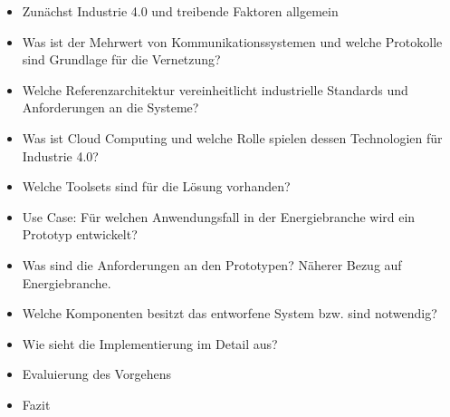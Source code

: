 \begin{itemize}
  \item Zunächst Industrie 4.0 und treibende Faktoren allgemein
  \item Was ist der Mehrwert von Kommunikationssystemen und welche Protokolle sind Grundlage für die Vernetzung?
  \item Welche Referenzarchitektur vereinheitlicht industrielle Standards und Anforderungen an die Systeme?
  \item Was ist Cloud Computing und welche Rolle spielen dessen Technologien für Industrie 4.0?
  \item Welche Toolsets sind für die Lösung vorhanden?
  \item Use Case: Für welchen Anwendungsfall in der Energiebranche wird ein Prototyp entwickelt?
  \item Was sind die Anforderungen an den Prototypen? Näherer Bezug auf Energiebranche.
  \item Welche Komponenten besitzt das entworfene System bzw. sind notwendig?
  \item Wie sieht die Implementierung im Detail aus?
  \item Evaluierung des Vorgehens
  \item Fazit
\end{itemize}



\newpage
